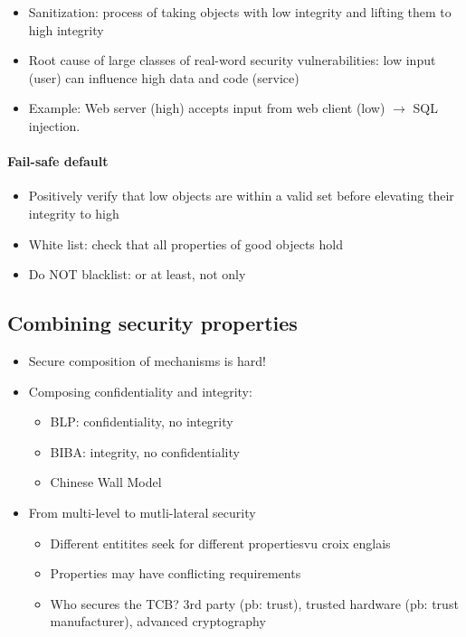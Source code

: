 \documentclass{article}
\newenvironment{myitemize}
{ \begin{itemize}
    \setlength{\itemsep}{005pt}
    \setlength{\parskip}{0pt}
    \setlength{\parsep}{0pt}     }
{ \end{itemize}                  }
\begin{document}
\begin{multicols}{2}
\begin{myitemize}
    \item Sanitization: process of taking objects with low integrity and lifting them to high integrity
    \item Root cause of large classes of real-word security vulnerabilities: low input (user) can influence high data and code (service)
    \item Example: Web server (high) accepts input from web client (low) $\rightarrow$ SQL injection. 
\end{myitemize}

\paragraph{Fail-safe default}

\begin{myitemize}
    \item Positively verify that low objects are within a valid set before elevating their integrity to high
    \item White list: check that all properties of good objects hold
    \item Do NOT blacklist: or at least, not only 
\end{myitemize}


\subsection{Combining security properties}

\begin{myitemize}
    \item Secure composition of mechanisms is hard! 
    \item Composing confidentiality and integrity:
    \begin{myitemize}
        \item BLP: confidentiality, no integrity
        \item BIBA: integrity, no confidentiality
        \item Chinese Wall Model
    \end{myitemize}
    \item From multi-level to mutli-lateral security
    \begin{myitemize}
        \item Different entitites seek for different propertiesvu croix englais
        \item Properties may have conflicting requirements
        \item Who secures the TCB? 3rd party (pb: trust), trusted hardware (pb: trust manufacturer), advanced cryptography 
    \end{myitemize}
\end{myitemize}



\end{multicols}
\end{document}
